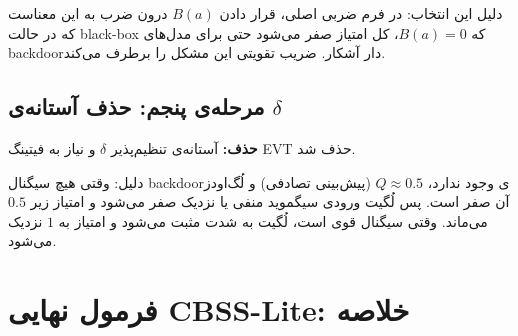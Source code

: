 \documentclass[12pt, a4paper]{article}
\newcommand{\en}[1]{\textenglish{#1}}
\newcommand{\cut}[1]{\textcolor{nored}{\textbf{حذف:}} #1}
\newcommand{\keep}[1]{\textcolor{yesgreen}{\textbf{نگه‌داشته‌شده:}} #1}
\newcommand{\param}[1]{\textcolor{accent}{\texttt{#1}}}
\begin{document}

دلیل این انتخاب: در فرم ضربی اصلی، قرار دادن \param{$B(a)$} درون ضرب به این معناست که در حالت \en{black-box} که \param{$B(a) = 0$}، کل امتیاز صفر می‌شود حتی برای مدل‌های \en{backdoor}دار آشکار. ضریب تقویتی این مشکل را برطرف می‌کند.

\subsection{مرحله‌ی پنجم: حذف آستانه‌ی \en{$\delta$}}

\begin{cutbox}
\cut{آستانه‌ی تنظیم‌پذیر \param{$\delta$} و نیاز به فیتینگ \en{EVT}} حذف شد.
\end{cutbox}


دلیل: وقتی هیچ سیگنال \en{backdoor}ی وجود ندارد، \param{$Q \approx 0.5$} (پیش‌بینی تصادفی) و لُگ‌اودز آن صفر است. پس لُگیت ورودی سیگموید منفی یا نزدیک صفر می‌شود و امتیاز زیر \param{$0.5$} می‌ماند. وقتی سیگنال قوی است، لُگیت به شدت مثبت می‌شود و امتیاز به \param{$1$} نزدیک می‌شود.

\section{فرمول نهایی \en{CBSS-Lite}: خلاصه}
\end{document}
